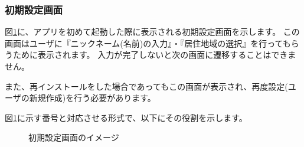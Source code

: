 \documentclass[a4j]{jarticle}
\begin{document}
\subsubsection{初期設定画面}
図\ref{honjo_setup}に、アプリを初めて起動した際に表示される初期設定画面を示します。
この画面はユーザに『ニックネーム(名前)の入力』・『居住地域の選択』を行ってもらうために表示されます。
入力が完了しないと次の画面に遷移することはできません。

また、再インストールをした場合であってもこの画面が表示され、再度設定(ユーザの新規作成)を行う必要があります。

図\ref{honjo_setup}に示す番号と対応させる形式で、以下にその役割を示します。

\begin{figure}[H]
    \begin{center}
    \caption {初期設定画面のイメージ}
    \label{honjo_setup}
    \end{center}
\end{figure}
\end{document}
